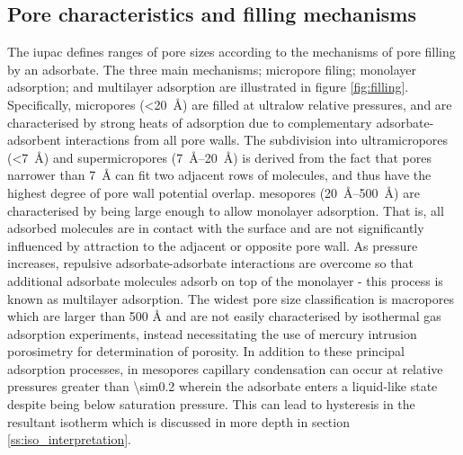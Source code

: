 \subsection{Pore characteristics and filling mechanisms}
\label{ss:pore_filling}

The \acrfull{iupac} defines ranges of pore sizes according to the mechanisms of pore filling by an \gls{adsorbate}.\citep{Thommes2015Physisorption} The three main mechanisms; \gls{micropore} filing; monolayer adsorption; and multilayer adsorption are illustrated in figure \ref{fig:filling}. Specifically, \glspl{micropore} (\qty{<20}{\angstrom})\citep{mcnaught1997compendium} are filled at ultralow relative pressures, and are characterised by strong heats of adsorption due to complementary \gls{adsorbate}-\gls{adsorbent} interactions from all pore walls.\citep{dubinin1989fundamentals} The subdivision into \glspl{ultramicropore} (\qty{<7}{\angstrom}) and \glspl{supermicropore} (\qtyrange[range-units=single]{7}{20}{\angstrom})\citep{mcnaught1997compendium} is derived from the fact that pores narrower than \qty{7}{\angstrom} can fit two adjacent rows of  molecules,\citep{Thommes2015Physisorption} and thus have the highest degree of pore wall potential overlap. \Glspl{mesopore} (\qtyrange[range-units=single]{20}{500}{\angstrom})\citep{mcnaught1997compendium} are characterised by being large enough to allow monolayer adsorption. That is, all adsorbed molecules are in contact with the surface and are not significantly influenced by attraction to the adjacent or opposite pore wall.\citep{gregg1967adsorption, yang1997gas} As pressure increases, repulsive \gls{adsorbate}-\gls{adsorbate} interactions are overcome so that additional \gls{adsorbate} molecules adsorb on top of the monolayer - this process is known as multilayer adsorption. The widest pore size classification is \glspl{macropore} which are larger than 500 \unit{\angstrom}\citep{mcnaught1997compendium} and are not easily characterised by isothermal gas adsorption experiments, instead necessitating the use of mercury intrusion porosimetry for determination of porosity.\citep{abell1999mercury, gregg1967adsorption, haynes1973pore} In addition to these principal adsorption processes, in \glspl{mesopore} capillary condensation can occur at relative pressures greater than \num{\sim0.2} wherein the adsorbate enters a liquid-like state despite being below saturation pressure. This can lead to hysteresis in the resultant isotherm\citep{Thommes2015Physisorption, monson2012understanding} which is discussed in more depth in section \ref{ss:iso_interpretation}.

